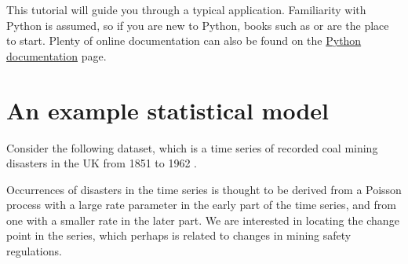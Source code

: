 
This tutorial will guide you through a typical  application.
Familiarity with Python is assumed, so if you are new to Python, books such as
\citet{Lutz:2007} or \citet{Langtangen:2009} are the place to start. Plenty of
online documentation can also be found on the
\href{http://www.python.org/doc/}{Python documentation} page.

\section{An example statistical model}
Consider the following dataset, which is a time series of recorded coal mining
disasters in the UK from 1851 to 1962 \citep{Jarrett:1979fr}.
\begin{center}
\end{center}
Occurrences of disasters in the time series is thought to be derived from a Poisson process with a large rate parameter in the early part of the time series, and from one with a smaller rate in the later part. We are interested in locating the change point in the series, which perhaps is related to changes in mining safety regulations.

